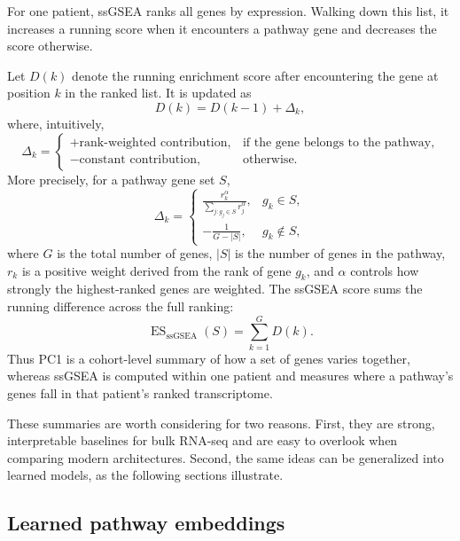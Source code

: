 \documentclass[11pt]{article}
\begin{document}
For one patient, ssGSEA ranks all genes by expression. Walking down this list,
it increases a running score when it encounters a pathway gene and decreases
the score otherwise.

Let $D(k)$ denote the running enrichment score after encountering the gene at
position $k$ in the ranked list. It is updated as
\begin{equation}
    D(k) = D(k-1) + \Delta_k,
\end{equation}
where, intuitively,
\begin{equation}
    \Delta_k =
    \begin{cases}
        +\text{rank-weighted contribution}, & \text{if the gene belongs to the pathway}, \\[4pt]
        -\text{constant contribution}, & \text{otherwise}.
    \end{cases}
\end{equation}
More precisely, for a pathway gene set $S$,
\begin{equation}
    \Delta_k =
    \begin{cases}
        \displaystyle
        \frac{r_k^{\alpha}}
        {\sum_{j:g_j \in S} r_j^{\alpha}},
        & g_k \in S, \\[10pt]
        \displaystyle
        -\frac{1}{G-|S|},
        & g_k \notin S,
    \end{cases}
\end{equation}
where $G$ is the total number of genes, $|S|$ is the number of genes in the
pathway, $r_k$ is a positive weight derived from the rank of gene $g_k$, and
$\alpha$ controls how strongly the highest-ranked genes are weighted. The
ssGSEA score sums the running difference across the full ranking:
\begin{equation}
    \operatorname{ES}_{\mathrm{ssGSEA}}(S) = \sum_{k=1}^{G} D(k).
\end{equation}
Thus PC1 is a cohort-level summary of how a set of genes varies together,
whereas ssGSEA is computed within one patient and measures where a pathway's
genes fall in that patient's ranked transcriptome.

These summaries are worth considering for two reasons. First, they are strong,
interpretable baselines for bulk RNA-seq and are easy to overlook when comparing
modern architectures. Second, the same ideas can be generalized into learned
models, as the following sections illustrate.


\subsection{Learned pathway embeddings}
\end{document}
